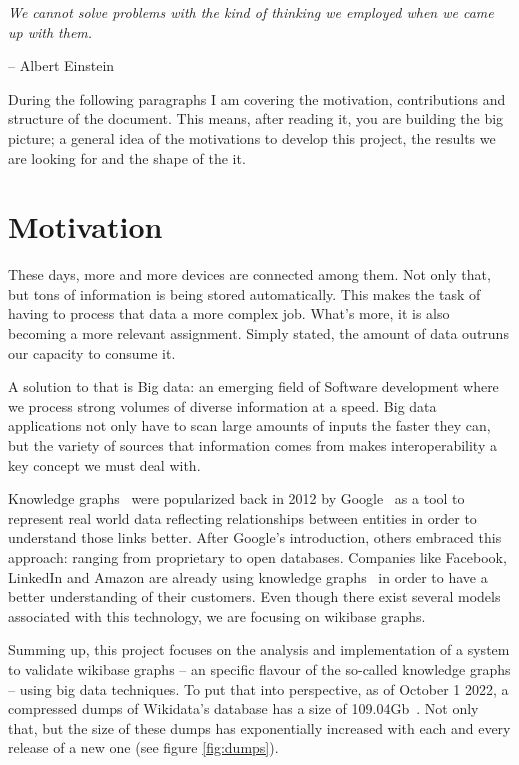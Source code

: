 \epigraph{\textit{We cannot solve problems with the kind of thinking we employed when we came up with them.}}{-- \textup{Albert Einstein}}

During the following paragraphs I am covering the motivation, contributions and structure of the document. This means, after reading it, you are building the big picture; a general idea of the motivations to develop this project, the results we are looking for and the shape of the it.

\section{Motivation}

These days, more and more devices are connected among them. Not only that, but tons of information is being stored automatically. This makes the task of having to process that data a more complex job. What's more, it is also becoming a more relevant assignment. Simply stated, the amount of data outruns our capacity to consume it.

A solution to that is Big data: an emerging field of Software development where we process strong volumes of diverse information at a speed. Big data applications not only have to scan large amounts of inputs the faster they can, but the variety of sources that information comes from makes interoperability a key concept we must deal with.

Knowledge graphs~\cite{https://doi.org/10.48550/arxiv.2110.11709} were popularized back in 2012 by Google~\cite{web:knowledge_graphs:google} as a tool to represent real world data reflecting relationships between entities in order to understand those links better. After Google's introduction, others embraced this approach: ranging from proprietary to open databases. Companies like Facebook, LinkedIn and Amazon are already using knowledge graphs~\cite{web:knowledge_graphs:use} in order to have a better understanding of their customers. Even though there exist several models associated with this technology, we are focusing on wikibase graphs.

Summing up, this project focuses on the analysis and implementation of a system to validate wikibase graphs -- an specific flavour of the so-called knowledge graphs -- using big data techniques. To put that into perspective, as of October 1 2022, a compressed \gls{dumps} of Wikidata's database has a size of 109.04Gb~\cite{wikidata:dumps}. Not only that, but the size of these dumps has exponentially increased with each and every release of a new one (see figure \ref{fig:dumps}).

